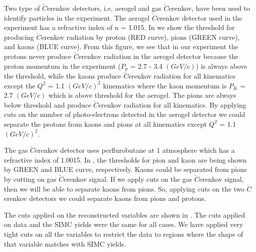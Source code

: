 %
Two type of $\breve{C}$erenkov detectors, i.e, aerogel and gas $\breve{C}$erenkov, have been used to identify particles in the experiment. The aerogel $\breve{C}$erenkov detector used in the experiment has a refractive index of n = 1.015. In  we show the threshold for producing $\breve{C}$erenkov radiation by proton (RED curve), pions (GREEN curve), and kaons (BLUE curve). From this figure, we see that in our experiment the protons never produce $\breve{C}$erenkov radiation in the aerogel detector because the proton momentum in the experiment ($P_p$ = 2.7 - 3.4 $(GeV/c)$) is always above the threshold, while the kaons produce $\breve{C}$erenkov radiation for all kinematics except the $Q^2$ = 1.1 $(GeV/c)^2$ kinematics where the kaon momentum is $P_K$ = 2.7 $(GeV/c)$ which is above threshold for the aerogel. The pions are always below threshold and produce $\breve{C}$erenkov radiation for all kinematics. By applying cuts on the number of photo-electrons detected in the aerogel detector we could separate the protons from kaons and pions at all kinematics except $Q^2$ = 1.1 $(GeV/c)^2$. 

The gas $\breve{C}$erenkov detector uses perflurobutane at 1 atmosphere which has a refractive index of 1.0015. In , the thresholds for pion and kaon are being shown by GREEN and BLUE curve, respectively. Kaons could be separated from pions by cutting on gas $\breve{C}$erenkov signal. If we apply cuts on the gas $\breve{C}$erenkov signal, then we will be able to separate kaons from pions. So, applying cuts on the two $\breve{C}$erenkov detectors we could separate kaons from pions and protons.

\label{Cuts}
The cuts applied on the reconstructed variables are shown in . The cuts applied on data and the SIMC yields were the same for all cases. We have applied very tight cuts on all the variables to restrict the data to regions where the shape of that variable matches with SIMC yields.

